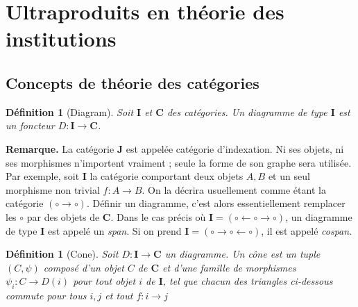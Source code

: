 \documentclass[11pt,a4paper]{article}
\newtheorem{defi}[theo]{Définition}
\newcommand{\gr}{\textbf}
\newcommand{\il}{\textit}
\newcommand{\1}{\mathbbm{1}}
\begin{document}
\section{Ultraproduits en théorie des institutions}

\subsection{Concepts de théorie des catégories}

\begin{defi}[Diagram]
Soit $\gr{I}$ et $\gr{C}$ des catégories. Un diagramme de type $\gr{I}$ est un foncteur $D : \gr{I} \to \gr{C}$.
\end{defi}
\gr{Remarque.} La catégorie $\gr{J}$ est appelée catégorie d'indexation. Ni ses objets, ni ses morphismes n'importent vraiment ; seule la forme de son graphe sera utilisée. Par exemple, soit $\gr{I}$ la catégorie comportant deux objets $A,B$ et un seul morphisme non trivial $f : A \to B$. On la décrira usuellement comme étant la catégorie $ (\circ \rightarrow \circ) $. Définir un diagramme, c'est alors essentiellement remplacer les $\circ$ par des objets de $\gr{C}$. Dans le cas précis où $\gr{I} = (\circ \leftarrow \circ \rightarrow \circ)$, un diagramme de type $\gr{I}$ est appelé un \il{span}. Si on prend $\gr{I} = (\circ \rightarrow \circ \leftarrow \circ)$, il est appelé \il{cospan}.

\begin{defi}[Cone]
Soit $D : \gr{I} \to \gr{C}$ un diagramme. Un cône est un tuple $(C,\psi)$ composé d'un objet $C$ de $\gr{C}$ et d'une famille de morphismes $\psi_i : C \to D(i)$ pour tout objet $i$ de $\gr{I}$, tel que chacun des triangles ci-dessous commute pour tous $i,j$ et tout $f : i \to j$

\begin{center}
\end{center}

\end{defi}
\end{document}
